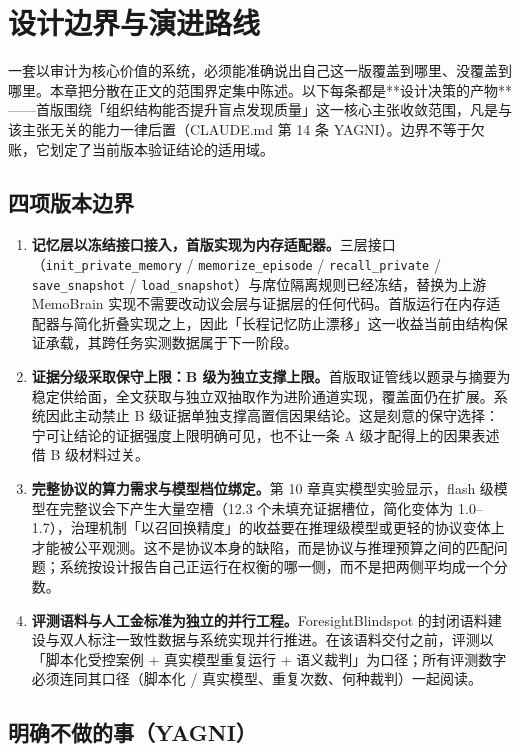 \section{设计边界与演进路线}

一套以审计为核心价值的系统，必须能准确说出自己这一版覆盖到哪里、没覆盖到哪里。本章把分散在正文的范围界定集中陈述。以下每条都是**设计决策的产物**——首版围绕「组织结构能否提升盲点发现质量」这一核心主张收敛范围，凡是与该主张无关的能力一律后置（CLAUDE.md 第 14 条 YAGNI）。边界不等于欠账，它划定了当前版本验证结论的适用域。

\subsection{四项版本边界}

\begin{enumerate}[leftmargin=1.6em, itemsep=4pt]
\item \textbf{记忆层以冻结接口接入，首版实现为内存适配器。}三层接口（\texttt{init\_private\_memory} / \texttt{memorize\_episode} / \texttt{recall\_private} / \texttt{save\_snapshot} / \texttt{load\_snapshot}）与席位隔离规则已经冻结，替换为上游 MemoBrain 实现不需要改动议会层与证据层的任何代码。首版运行在内存适配器与简化折叠实现之上，因此「长程记忆防止漂移」这一收益当前由结构保证承载，其跨任务实测数据属于下一阶段。
\item \textbf{证据分级采取保守上限：B 级为独立支撑上限。}首版取证管线以题录与摘要为稳定供给面，全文获取与独立双抽取作为进阶通道实现，覆盖面仍在扩展。系统因此主动禁止 B 级证据单独支撑高置信因果结论。这是刻意的保守选择：宁可让结论的证据强度上限明确可见，也不让一条 A 级才配得上的因果表述借 B 级材料过关。
\item \textbf{完整协议的算力需求与模型档位绑定。}第 10 章真实模型实验显示，flash 级模型在完整议会下产生大量空槽（12.3 个未填充证据槽位，简化变体为 1.0--1.7），治理机制「以召回换精度」的收益要在推理级模型或更轻的协议变体上才能被公平观测。这不是协议本身的缺陷，而是协议与推理预算之间的匹配问题；系统按设计报告自己正运行在权衡的哪一侧，而不是把两侧平均成一个分数。
\item \textbf{评测语料与人工金标准为独立的并行工程。}ForesightBlindspot 的封闭语料建设与双人标注一致性数据与系统实现并行推进。在该语料交付之前，评测以「脚本化受控案例 + 真实模型重复运行 + 语义裁判」为口径；所有评测数字必须连同其口径（脚本化 / 真实模型、重复次数、何种裁判）一起阅读。
\end{enumerate}

\subsection{明确不做的事（YAGNI）}

